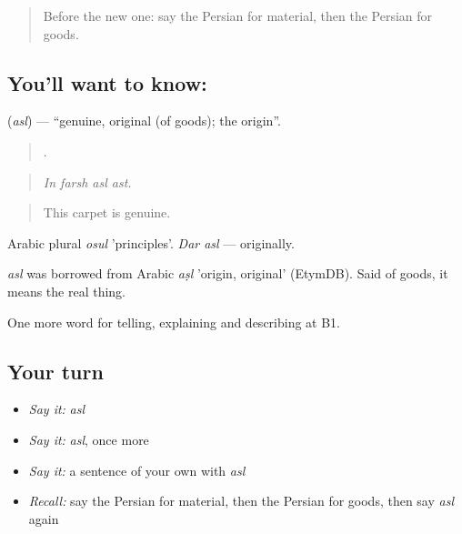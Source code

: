 \label{lesson:FA-C459-asl}



\begin{quote}
Before the new one: say the Persian for material, then the Persian for goods.
\end{quote}

\subsection*{You'll want to know: }
\textbf{} (\emph{asl}) — \textquotedblleft{}genuine, original (of goods); the origin\textquotedblright{}.

\begin{quote}
   .
\end{quote}

\begin{quote}
\emph{In farsh asl ast.}
\end{quote}

\begin{quote}
This carpet is genuine.
\end{quote}

Arabic plural \emph{osul} 'principles'. \emph{Dar asl} — originally.

\begin{cousinweb}
\emph{asl} was borrowed from Arabic \emph{aṣl} 'origin, original' (EtymDB). Said of goods, it means the real thing.
\end{cousinweb}

\begin{grammarlens}[title={What you've built}]
One more word for telling, explaining and describing at B1.
\end{grammarlens}

\subsection*{Your turn}
\begin{itemize}
\raggedright
  \item \emph{Say it:} \emph{asl}
  \item \emph{Say it:} \emph{asl}, once more
  \item \emph{Say it:} a sentence of your own with \emph{asl}
  \item \emph{Recall:} say the Persian for material, then the Persian for goods, then say \emph{asl} again
\end{itemize}


